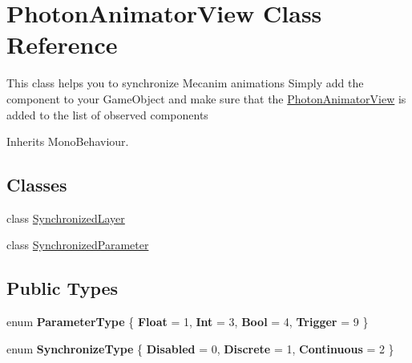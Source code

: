 \hypertarget{class_photon_animator_view}{}\section{Photon\+Animator\+View Class Reference}
\label{class_photon_animator_view}


This class helps you to synchronize Mecanim animations Simply add the component to your Game\+Object and make sure that the \hyperlink{class_photon_animator_view}{Photon\+Animator\+View} is added to the list of observed components  




Inherits Mono\+Behaviour.

\subsection*{Classes}
\begin{DoxyCompactItemize}
\item 
class \hyperlink{class_photon_animator_view_1_1_synchronized_layer}{Synchronized\+Layer}
\item 
class \hyperlink{class_photon_animator_view_1_1_synchronized_parameter}{Synchronized\+Parameter}
\end{DoxyCompactItemize}
\subsection*{Public Types}
\begin{DoxyCompactItemize}
\item 
enum {\bfseries Parameter\+Type} \{ {\bfseries Float} = 1, 
{\bfseries Int} = 3, 
{\bfseries Bool} = 4, 
{\bfseries Trigger} = 9
 \}\hypertarget{class_photon_animator_view_aa41dc91e8da385b9f10cf9bf5dc47894}{}\label{class_photon_animator_view_aa41dc91e8da385b9f10cf9bf5dc47894}

\item 
enum {\bfseries Synchronize\+Type} \{ {\bfseries Disabled} = 0, 
{\bfseries Discrete} = 1, 
{\bfseries Continuous} = 2
 \}\hypertarget{class_photon_animator_view_ae3ad07de936a811cbb923adffe1f167f}{}\label{class_photon_animator_view_ae3ad07de936a811cbb923adffe1f167f}

\end{DoxyCompactItemize}
